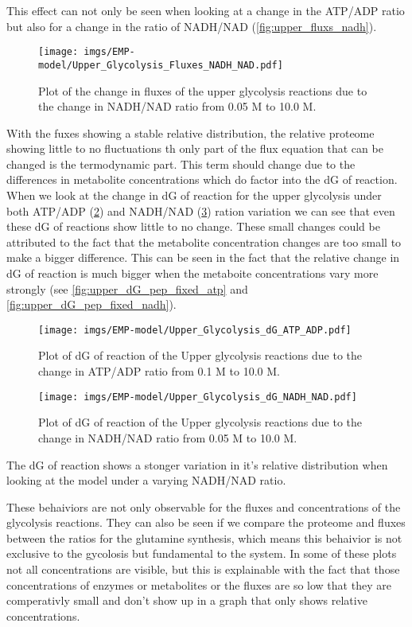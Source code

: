 This effect can not only be seen when looking at a change in the ATP/ADP ratio but also for a change in the ratio of NADH/NAD (\ref{fig:upper_fluxs_nadh}).
\begin{figure}[H]
    \centering
    \texttt{[image: imgs/EMP-model/Upper\_Glycolysis\_Fluxes\_NADH\_NAD.pdf]}
    \caption{Plot of the change in fluxes of the upper glycolysis reactions due to the change in NADH/NAD ratio from 0.05 M to 10.0 M.}
    \label{fig:upper_fluxes_nadh}
\end{figure}

With the fuxes showing a stable relative distribution, the relative proteome showing little to no fluctuations th only part of the flux equation that can be changed is the termodynamic part. This term should change due to the differences in metabolite concentrations which do factor into the dG of reaction. 
When we look at the change in dG of reaction for the upper glycolysis under both ATP/ADP (\ref{fig:upper_dG_atp}) and NADH/NAD (\ref{fig:upper_dG_nadh}) ration variation we can see that even these dG of reactions show little to no change. These small changes could be attributed to the fact that the metabolite concentration changes are too small to make a bigger difference. This can be seen in the fact that the relative change in dG of reaction is much bigger when the metaboite concentrations vary more strongly (see \ref{fig:upper_dG_pep_fixed_atp} and \ref{fig:upper_dG_pep_fixed_nadh}).
\begin{figure}[H]
    \centering
    \texttt{[image: imgs/EMP-model/Upper\_Glycolysis\_dG\_ATP\_ADP.pdf]}
    \caption{Plot of dG of reaction of the Upper glycolysis reactions due to the change in ATP/ADP ratio from 0.1 M to 10.0 M.}
    \label{fig:upper_dG_atp}
\end{figure}

\begin{figure}[H]
    \centering
    \texttt{[image: imgs/EMP-model/Upper\_Glycolysis\_dG\_NADH\_NAD.pdf]}
    \caption{Plot of dG of reaction of the Upper glycolysis reactions due to the change in NADH/NAD ratio from 0.05 M to 10.0 M.}
    \label{fig:upper_dG_nadh}
\end{figure}

The dG of reaction shows a stonger variation in it's relative distribution when looking at the model under a varying NADH/NAD ratio. 

These behaiviors are not only observable for the fluxes and concentrations of the glycolysis reactions. They can also be seen if we compare the proteome and fluxes between the ratios for the glutamine synthesis, which means this behaivior is not exclusive to the gycolosis but fundamental to the system.
In some of these plots not all concentrations are visible, but this is explainable with the fact that those concentrations of enzymes or metabolites or the fluxes are so low that they are comperativly small and don't show up in a graph that only shows relative concentrations.

